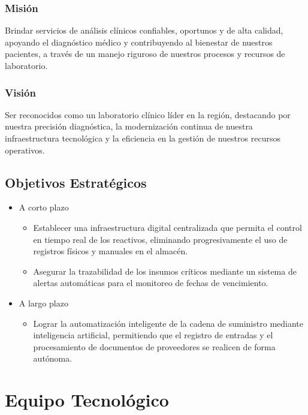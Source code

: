 \documentclass[12pt,a4paper]{article}
\begin{document}
\subsubsection{Misión}

Brindar servicios de análisis clínicos confiables, oportunos y de alta calidad, apoyando el diagnóstico médico y contribuyendo al bienestar de nuestros pacientes, a través de un manejo riguroso de nuestros procesos y recursos de laboratorio.

\subsubsection{Visión}
Ser reconocidos como un laboratorio clínico líder en la región, destacando por nuestra precisión diagnóstica, la modernización continua de nuestra infraestructura tecnológica y la eficiencia en la gestión de nuestros recursos operativos.

\subsection{Objetivos Estratégicos}

\begin{itemize}
    \item A corto plazo
          \begin{itemize}[label=-]
              \item Establecer una infraestructura digital centralizada que permita el control en tiempo real de los reactivos, eliminando progresivamente el uso de registros físicos y manuales en el almacén.
              \item Asegurar la trazabilidad de los insumos críticos mediante un sistema de alertas automáticas para el monitoreo de fechas de vencimiento.
          \end{itemize}
    \item A largo plazo
          \begin{itemize}[label=-]
              \item Lograr la automatización inteligente de la cadena de suministro mediante inteligencia artificial, permitiendo que el registro de entradas y el procesamiento de documentos de proveedores se realicen de forma autónoma.
          \end{itemize}
\end{itemize}

\section{Equipo Tecnológico}
\end{document}

